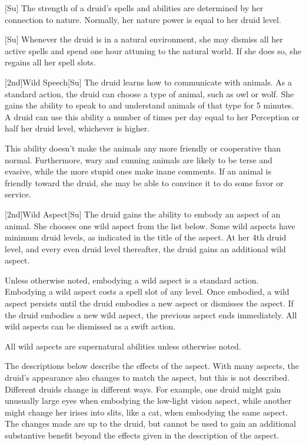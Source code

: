 [Su]
The strength of a druid's spells and abilities are determined by her connection to nature.
Normally, her nature power is equal to her druid level.

[Su]
Whenever the druid is in a natural environment, she may dismiss all her active spells and spend one hour attuning to the natural world.
If she does so, she regains all her spell slots.

[2nd]{Wild Speech}[Su]
The druid learns how to communicate with animals.
As a standard action, the druid can choose a type of animal, such as owl or wolf.
She gains the ability to speak to and understand animals of that type for 5 minutes.
A druid can use this ability a number of times per day equal to her Perception or half her druid level, whichever is higher.

This ability doesn't make the animals any more friendly or cooperative than normal.
Furthermore, wary and cunning animals are likely to be terse and evasive, while the more stupid ones make inane comments.
If an animal is friendly toward the druid, she may be able to convince it to do some favor or service.

[2nd]{Wild Aspect}[Su]
The druid gains the ability to embody an aspect of an animal.
She chooses one wild aspect from the list below.
Some wild aspects have minimum druid levels, as indicated in the title of the aspect.
At her 4th druid level, and every even druid level thereafter, the druid gains an additional wild aspect.

Unless otherwise noted, embodying a wild aspect is a standard action.
Embodying a wild aspect costs a spell slot of any level.
Once embodied, a wild aspect persists until the druid embodies a new aspect or dismisses the aspect.
If the druid embodies a new wild aspect, the previous aspect ends immediately.
All wild aspects can be dismissed as a swift action.

All wild aspects are supernatural abilities unless otherwise noted.

The descriptions below describe the effects of the aspect.
With many aspects, the druid's appearance also changes to match the aspect, but this is not described.
Different druids change in different ways.
For example, one druid might gain unusually large eyes when embodying the low-light vision aspect, while another might change her irises into slits, like a cat, when embodying the same aspect.
The changes made are up to the druid, but cannot be used to gain an additional substantive benefit beyond the effects given in the description of the aspect.

